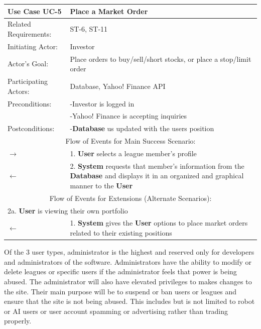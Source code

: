 \begin{centering}
\label{UC-5}
\renewcommand\arraystretch{1.3}
\begin{longtable}{|p{1.2in} p{5in}|}
\hline
\bfseries{\color{color1}Use Case UC-5} &
\bfseries{\color{color1}Place a Market Order} \\
\hline
Related Requirements: & ST-6, ST-11 \\
Initiating Actor:     & Investor \\
Actor's Goal:         & Place orders to buy/sell/short stocks, or place a stop/limit order \\
Participating Actors: & Database, Yahoo! Finance API \\
Preconditions:        & -Investor is logged in \\
                      & -Yahoo! Finance is accepting inquiries \\
Postconditions:       & -\textbf{Database} us updated with the users position \\
\hline
\multicolumn{2}{|c|}{\color{color1}Flow of Events for Main Success Scenario:}\\
\hline
$\rightarrow$ & 1. \textbf{User} selects a league member's profile \\
$\leftarrow$ & 2. \textbf{System} requests that member's information from the \textbf{Database} and displays it in an organized and graphical manner to the \textbf{User} \\
\hline
\multicolumn{2}{|c|}{\color{color1}Flow of Events for Extensions (Alternate Scenarios):} \\
\hline
\multicolumn{2}{|p{6.2in}|}{2a. \textbf{User} is viewing their own portfolio} \\
\hline
$\leftarrow$ & 1. \textbf{System} gives the \textbf{User} options to place market orders related to their existing positions \\
\hline
\end{longtable}
\end{centering}

Of the 3 user types, administrator is the highest and reserved only for developers and
administrators of the software. Administrators have the ability to modify or delete leagues
or specific users if the administrator feels that power is being abused. The administrator
will also have elevated privileges to makes changes to the site. Their main purpose will be to
suspend or ban users or leagues and ensure that the site is not being abused. This includes but
is not limited to robot or AI users or user account spamming or advertising rather than trading
properly. \\

